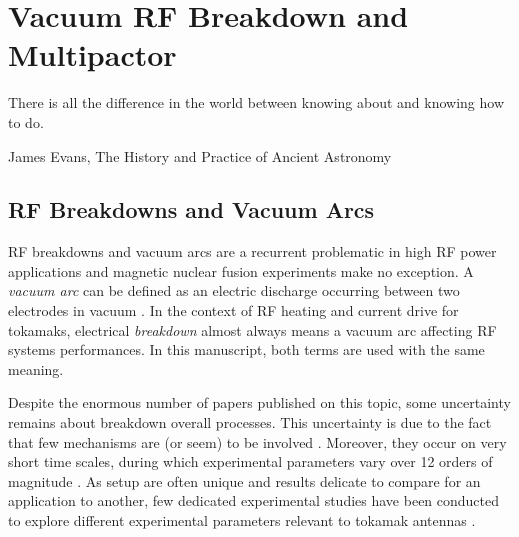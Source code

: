 \setchapterpreamble[u]{\margintoc}
\chapter{Vacuum RF Breakdown and Multipactor}\label{chap:Multipactor}

\epigraph{There is all the difference in the world between knowing about and knowing how to do.}{James Evans, The History and Practice of Ancient Astronomy}


\section{RF Breakdowns and Vacuum Arcs}
RF breakdowns and vacuum arcs are a recurrent problematic in high RF power applications and magnetic nuclear fusion experiments make no exception. A \textit{vacuum arc} can be defined as an electric discharge occurring between two electrodes in vacuum . In the context of RF heating and current drive for tokamaks, electrical \textit{breakdown} almost always means a vacuum arc affecting RF systems performances. In this manuscript, both terms are used with the same meaning.

Despite the enormous number of papers published on this topic, some uncertainty remains about breakdown overall processes. This uncertainty is due to the fact that few mechanisms are (or seem) to be involved . Moreover, they occur on very short time scales, during which experimental parameters vary over 12 orders of magnitude \cite{Timko2011}. As setup are often unique and results delicate to compare for an application to another, few dedicated experimental studies have been conducted to explore different  experimental parameters relevant to tokamak antennas .

